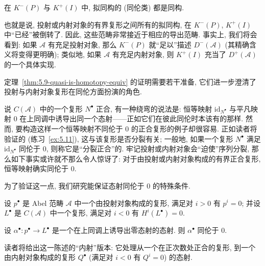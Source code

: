 \begin{corollary}\label{cor:5.10-quasi-iso-invertible}
在 $K^-(P)$ 与 $K^+(I)$ 中, 拟同构的 (同伦类) 都是同构.
\end{corollary}

\indent 也就是说, 投射或内射对象的有界复形之间所有的拟同构, 在 $K^-(P)$, $K^+(I)$ 中``已经''被倒转了. 因此, 这些范畴非常接近于相应的导出范畴. 事实上, 我们将会看到: 如果 $\mathcal{A}$ 有充足投射对象, 那么 $K^-(P)$ 就``足以''描述 $D^-(\mathcal{A})$ (其精确含义将变得更明确); 类似地, 如果 $\mathcal{A}$ 有充足内射对象, 则 $K^+(I)$ 充当了 $D^+(\mathcal{A})$ 的一个具体实现.

\indent 定理~\ref{thm:5.9-quasi-is-homotopy-equiv} 的证明需要若干准备, 它们进一步澄清了投射与内射对象复形在同伦方面扮演的角色.

\indent 说 $C(\mathcal{A})$ 中的一个复形 $N^\bullet$ 正合, 有一种绕弯的说法是: 恒等映射 $\mathrm{id}_{N^\bullet}$ 与平凡映射 $0$ 在上同调中诱导出同一个态射——正如它们在彼此同伦时本该有的那样. 然而, 要构造这样一个恒等映射不同伦于 $0$ 的正合复形的例子却很容易. 正如读者将验证的 (练习~\ref{ex:5.11}), 这与该复形是否分裂有关; 一般地, 如果一个复形 $N^\bullet$ 满足 $\mathrm{id}_{N^\bullet}$ 同伦于 $0$, 则称它是``分裂正合''的. 牢记投射或内射对象会``迫使''序列分裂, 那么如下事实或许就不那么令人惊讶了: 对于由投射或内射对象构成的有界正合复形, 恒等映射确实同伦于 $0$.

\indent 为了验证这一点, 我们研究能保证态射同伦于 $0$ 的特殊条件.

\begin{lemma}\label{lem:5.11-proj-nullhomotopy}
设 $p^\bullet$ 是 Abel 范畴 $\mathcal{A}$ 中一个由投射对象构成的复形, 满足对 $i>0$ 有 $p^{i}=0$; 并设 $L^\bullet$ 是 $C(\mathcal{A})$ 中一个复形, 满足对 $i<0$ 有 $H^{i}(L^\bullet)=0$.

设 $\alpha^\bullet:p^\bullet\to L^\bullet$ 是一个在上同调上诱导出零态射的态射. 则 $\alpha^\bullet$ 同伦于 $0$.
\end{lemma}

\indent 读者将给出这一陈述的``内射''版本: 它处理从一个在正次数处正合的复形, 到一个由内射对象构成的复形 $Q^\bullet$ (满足对 $i<0$ 有 $Q^{i}=0$) 的态射.

